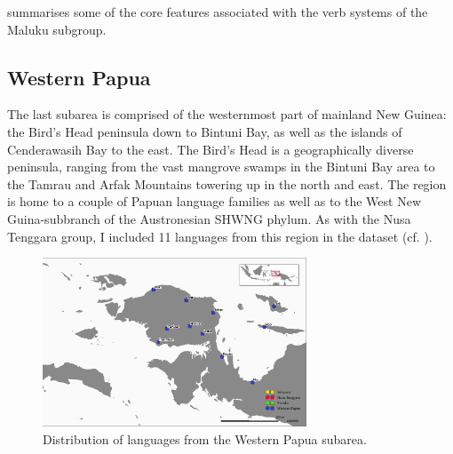  summarises some of the core features associated with the verb systems of the Maluku subgroup.

\begin{table}[h]
\caption[Basic features of Maluku verb systems]{Overview of basic verbal features of the Maluku languages in the EI data set. Constituent order lists only the basic pattern, pragmatically induced alternative patterns are often also available. Brackets indicate optional use of argument indexers.}
\label{table:overviewmaluku}
\end{table}

\subsection{Western Papua}\label{sec:westpapua2}

The last subarea is comprised of the westernmost part of mainland New Guinea: the Bird's Head peninsula down to Bintuni Bay, as well as the islands of Cenderawasih Bay to the east. The Bird's Head is a geographically diverse peninsula, ranging from the vast mangrove swamps in the Bintuni Bay area to the Tamrau and Arfak Mountains towering up in the north and east. The region is home to a couple of Papuan language families as well as to the West New Guina-subbranch of the Austronesian SHWNG phylum. As with the Nusa Tenggara group, I included 11 languages from this region in the dataset (cf. ). 

\begin{figure}

\includegraphics[width=0.7\textwidth]{figures/languages_Papua.pdf}
\caption{Distribution of languages from the Western Papua subarea.}\label{map:Pap}

\end{figure}

